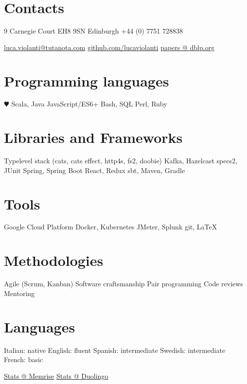 \documentclass[nocolors]{curriculum-vitae}
\begin{document}

    \begin{aside}
        \section{Contacts}
            9 Carnegie Court
            EH8 9SN Edinburgh
            +44 (0) 7751 728838
            \begin{footnotesize}\href{mailto:luca.violanti@tutanota.com}{luca.violanti@tutanota.com}
                \href{https://github.com/lucaviolanti}{github.com/lucaviolanti}
                \href{https://dblp.org/pid/163/5157.html}{papers @ dblp.org}\end{footnotesize}
        \section{Programming languages}
            $\varheartsuit$ Scala, Java
            JavaScript/ES6+
            Bash, SQL
            Perl, Ruby
        \section{Libraries and Frameworks}
            Typelevel stack
            (cats, cats effect,
            http4s, fs2, doobie)
            Kafka, Hazelcast
            specs2, JUnit
            Spring, Spring Boot
            React, Redux
            sbt, Maven, Gradle
        \section{Tools}
            Google Cloud Platform
            Docker, Kubernetes
            JMeter, Splunk
            git, \LaTeX
        \section{Methodologies}
            Agile (Scrum, Kanban)
            Software craftsmanship
            Pair programming
            Code reviews
            Mentoring
        \section{Languages}
            Italian: native
            English: fluent
            Spanish: intermediate
            Swedish: intermediate
            French: basic
            \begin{footnotesize}\href{https://app.memrise.com/user/LucaVee/}{Stats @ Memrise}
                \href{https://www.duolingo.com/profile/LucaVee}{Stats @ Duolingo}\end{footnotesize}
    \end{aside}
\end{document}
